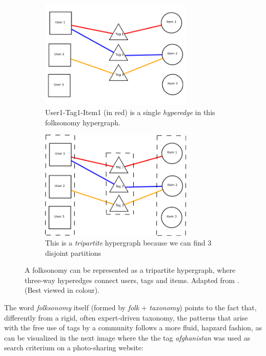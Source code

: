 \begin{figure}[H]
    \begin{subfigure}{0.5\textwidth}
        \centering
    \includegraphics[width=0.8\textwidth]{chapters/02_social_tagging/images/folksonomy-hypergraph.png}
    \caption{User1-Tag1-Item1 (in red) is a single \textit{hyperedge} in this folksonomy hypergraph.}
    \label{fig:folksonomy_hypergraph}
    \end{subfigure}
    \begin{subfigure}{0.5\textwidth}
        \centering
    \includegraphics[width=0.8\textwidth]{chapters/02_social_tagging/images/tripartite.png}
    \caption{This is a \textit{tripartite} hypergraph because we can find 3 disjoint partitions}
    \label{fig:folksonomy_tripartite}
    \end{subfigure}
    \caption{A folksonomy can be represented as a tripartite hypergraph, where three-way hyperedges connect users, tags and items. Adapted from \cite{rawashdeh_etal_2012}. (Best viewed in colour).}
\end{figure}

The word \textit{folksonomy} itself (formed by \textit{folk} + \textit{taxonomy}) points to the fact that, differently from a rigid, often expert-driven taxonomy, the patterns that arise with the free use of tags by a community follows a more fluid, hapzard fashion, as can be  visualized in the next image where the the tag \textit{afghanistan} was used as search criterium on a photo-sharing website: 

